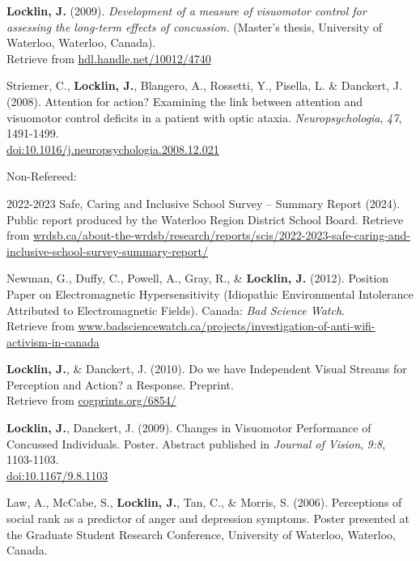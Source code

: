 \documentclass[10pt]{article}
\begin{document}
\begin{outerlist}
\item
  \textbf{Locklin, J.} (2009). \emph{Development of a measure of
  visuomotor control for assessing the long-term effects of concussion.}
  (Master's thesis, University of Waterloo, Waterloo, Canada).\\
  Retrieve from
  \href{http://hdl.handle.net/10012/4740}{hdl.handle.net/10012/4740}
\item
  Striemer, C., \textbf{Locklin, J.}, Blangero, A., Rossetti, Y.,
  Pisella, L. \& Danckert, J. (2008). Attention for action? Examining
  the link between attention and visuomotor control deficits in a
  patient with optic ataxia. \emph{Neuropsychologia}, \emph{47},
  1491-1499.\\
  \href{http://dx.doi.org/10.1016/j.neuropsychologia.2008.12.021}{doi:10.1016/j.neuropsychologia.2008.12.021}
\end{outerlist}

Non-Refereed:

\begin{outerlist}
\item
  2022-2023 Safe, Caring and Inclusive School Survey -- Summary Report
  (2024). Public report produced by the Waterloo Region District School
  Board. Retrieve from
  \href{https://www.wrdsb.ca/about-the-wrdsb/research/reports/scis/2022-2023-safe-caring-and-inclusive-school-survey-summary-report/}{wrdsb.ca/about-the-wrdsb/research/reports/scis/2022-2023-safe-caring-and-inclusive-school-survey-summary-report/}
\item
  Newman, G., Duffy, C., Powell, A., Gray, R., \& \textbf{Locklin, J.}
  (2012). Position Paper on Electromagnetic Hypersensitivity (Idiopathic
  Environmental Intolerance Attributed to Electromagnetic Fields).
  Canada: \emph{Bad Science Watch}.\\
  Retrieve from
  \href{http://www.badsciencewatch.ca/projects/investigation-of-anti-wifi-activism-in-canada}{www.badsciencewatch.ca/projects/investigation-of-anti-wifi-activism-in-canada}
\item
  \textbf{Locklin, J.}, \& Danckert, J. (2010). Do we have Independent
  Visual Streams for Perception and Action? a Response. Preprint.\\
  Retrieve from \href{http://cogprints.org/6854/}{cogprints.org/6854/}
\item
  \textbf{Locklin, J.}, Danckert, J. (2009). Changes in Visuomotor
  Performance of Concussed Individuals. Poster. Abstract published in
  \emph{Journal of Vision}, \emph{9:8}, 1103-1103.\\
  \href{http://dx.doi.org/10.1167/9.8.1103}{doi:10.1167/9.8.1103}
\item
  Law, A., McCabe, S., \textbf{Locklin, J.}, Tan, C., \& Morris, S.
  (2006). Perceptions of social rank as a predictor of anger and
  depression symptoms. Poster presented at the Graduate Student Research
  Conference, University of Waterloo, Waterloo, Canada.

  \pagebreak[3]
\end{outerlist}
\end{document}
